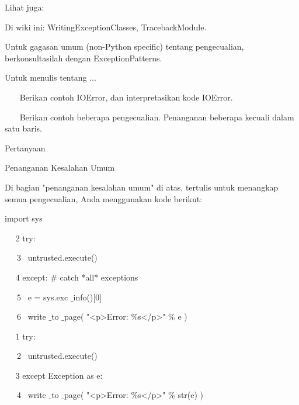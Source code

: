 \vspace{12pt}
Lihat juga: \par
\vspace{12pt}
Di wiki ini: WritingExceptionClasses, TracebackModule. \par
\vspace{12pt}
Untuk gagasan umum (non-Python specific) tentang pengecualian, berkonsultasilah dengan ExceptionPatterns. \par
\vspace{12pt}
Untuk menulis tentang ... \par
\vspace{12pt}
~~~ Berikan contoh IOError, dan interpretasikan kode IOError. \par
~~~ Berikan contoh beberapa pengecualian. Penanganan beberapa kecuali dalam satu baris. \par
\vspace{12pt}
Pertanyaan \par
\vspace{12pt}
Penanganan Kesalahan Umum \par
\vspace{12pt}
Di bagian "penanganan kesalahan umum" di atas, tertulis untuk menangkap semua pengecualian, Anda menggunakan kode berikut: \par
\vspace{12pt}
import sys \par
~~ 2 try: \par
\vspace{12pt}
~~~3~  untrusted.execute() \par
\vspace{12pt}
~~ 4 except:  $  \#  $ catch *all* exceptions \par
\vspace{12pt}
~~~5~  e = sys.exc $  \_  $info()[0] \par
\vspace{12pt}
~~~6~  write $  \_  $to $  \_  $page( "<p>Error:  $  \%  $s</p>"  $  \%  $ e ) \par
\vspace{12pt}
~~ 1 try: \par
\vspace{12pt}
~~~2~  untrusted.execute() \par
\vspace{12pt}
~~ 3 except Exception as e: \par
\vspace{12pt}
~~~4~  write $  \_  $to $  \_  $page( "<p>Error:  $  \%  $s</p>"  $  \%  $ str(e) ) \par
